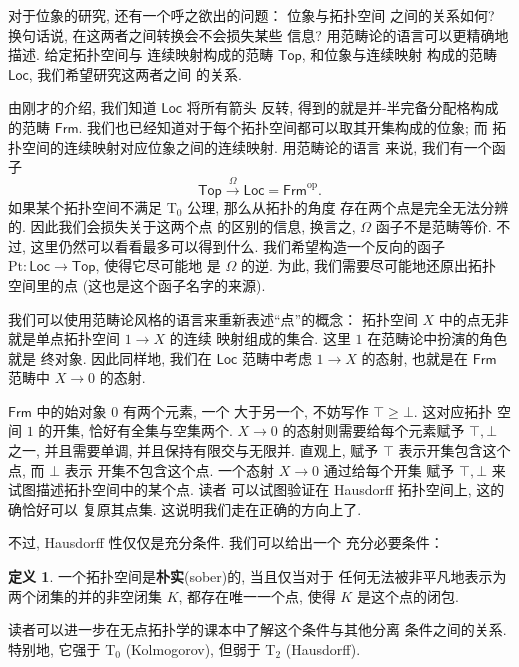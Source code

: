 \documentclass[UTF8]{ctexbook}
\theoremstyle{plain}
\theoremstyle{definition}
\newtheorem{definition}{定义}[chapter]
\theoremstyle{remark}
\begin{document}
对于位象的研究, 还有一个呼之欲出的问题： 位象与拓扑空间
之间的关系如何? 换句话说, 在这两者之间转换会不会损失某些
信息? 用范畴论的语言可以更精确地描述. 给定拓扑空间与
连续映射构成的范畴 \(\mathsf{Top}\), 和位象与连续映射
构成的范畴 \(\mathsf{Loc}\), 我们希望研究这两者之间
的关系.

由刚才的介绍, 我们知道 \(\mathsf{Loc}\) 将所有箭头
反转, 得到的就是并-半完备分配格构成的范畴 \(\mathsf{Frm}\).
我们也已经知道对于每个拓扑空间都可以取其开集构成的位象; 而
拓扑空间的连续映射对应位象之间的连续映射. 用范畴论的语言
来说, 我们有一个函子
\[\mathsf{Top} \xrightarrow{\Omega} \mathsf{Loc}
= \mathsf{Frm}^{\mathrm{op}}.\]
如果某个拓扑空间不满足 T\(_0\) 公理, 那么从拓扑的角度
存在两个点是完全无法分辨的. 因此我们会损失关于这两个点
的区别的信息, 换言之, \(\Omega\) 函子不是范畴等价.
不过, 这里仍然可以看看最多可以得到什么.
我们希望构造一个反向的函子 \(\mathrm{Pt} :
\mathsf{Loc} \to \mathsf{Top}\), 使得它尽可能地
是 \(\Omega\) 的逆. 为此, 我们需要尽可能地还原出拓扑
空间里的点 (这也是这个函子名字的来源).

我们可以使用范畴论风格的语言来重新表述“点”的概念： 拓扑空间
\(X\) 中的点无非就是单点拓扑空间 \(1 \to X\) 的连续
映射组成的集合. 这里 \(1\) 在范畴论中扮演的角色就是
终对象. 因此同样地, 我们在 \(\mathsf{Loc}\) 范畴中考虑
\(1 \to X\) 的态射, 也就是在 \(\mathsf{Frm}\) 范畴中
\(X \to 0\) 的态射.

\(\mathsf{Frm}\) 中的始对象 \(0\) 有两个元素, 一个
大于另一个, 不妨写作 \(\top \ge \bot\). 这对应拓扑
空间 \(1\) 的开集, 恰好有全集与空集两个.
\(X \to 0\) 的态射则需要给每个元素赋予 \(\top, \bot\)
之一, 并且需要单调, 并且保持有限交与无限并. 直观上,
赋予 \(\top\) 表示开集包含这个点, 而 \(\bot\) 表示
开集不包含这个点. 一个态射 \(X \to 0\) 通过给每个开集
赋予 \(\top,\bot\) 来试图描述拓扑空间中的某个点. 读者
可以试图验证在 Hausdorff 拓扑空间上, 这的确恰好可以
复原其点集. 这说明我们走在正确的方向上了.

不过, Hausdorff 性仅仅是充分条件. 我们可以给出一个
充分必要条件：
\begin{definition}
一个拓扑空间是\textbf{朴实}(sober)的, 当且仅当对于
任何无法被非平凡地表示为两个闭集的并的非空闭集 \(K\),
都存在唯一一个点, 使得 \(K\) 是这个点的闭包.
\end{definition}
读者可以进一步在无点拓扑学的课本中了解这个条件与其他分离
条件之间的关系. 特别地, 它强于 T\(_0\) (Kolmogorov),
但弱于 T\(_2\) (Hausdorff).
\end{document}
